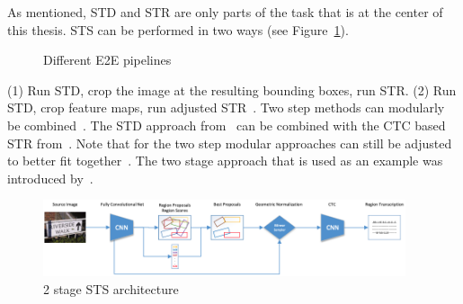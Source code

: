 As mentioned, \ac{STD} and \ac{STR} are only parts of the task that is at the center of this thesis.
\ac{STS} can be performed in two ways (see Figure~\ref{fig:e2e-pipelines}).

\begin{figure}[ht]
    \centering
    
    \caption{Different E2E pipelines\label{fig:e2e-pipelines}}
\end{figure}
(1) Run \ac{STD}, crop the image at the resulting bounding boxes, run \ac{STR}.
(2) Run \ac{STD}, crop feature maps, run adjusted \ac{STR}~\citep{chen_text_2021,long_scene_2021}.
Two step methods can modularly be combined~\citep{liao_textboxes_2017,shi_aster_2019}.
The \ac{STD} approach from~\cite{liao_textboxes_2017} can be combined with the CTC based \ac{STR}
from~\cite{shi_end--end_2017}.
Note that for the two step modular approaches can still be adjusted to better fit
together~\citep{liao_textboxes_2017}.
The two stage approach that is used as an example was introduced by~\cite{busta_deep_2017}.
\begin{figure}[h]
    \centering
    \includegraphics[width=0.95\textwidth]{img/E2E-two-stage-architecture-Bust-Deep-2017.png}
    \caption[2 stage STS architecture]{%
        2 stage STS architecture~\citep{busta_deep_2017}\label{fig:e2e-2-stage}
    }
\end{figure}

